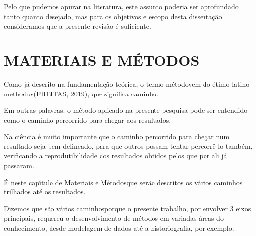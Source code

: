 \documentclass[
12pt,		%
openright,	%
twoside,  %
a4paper,			%
chapter=TITLE,		%
english,			%
french,				%
spanish,			%
brazil				%
]{USPSC-classe/USPSC}
\begin{document}
Pelo que pudemos apurar na literatura, este assunto poderia ser aprofundado tanto quanto desejado, mas para os objetivos e escopo desta disserta\c{c}\~ao consideramos que a presente revis\~ao \'e suficiente.









\chapter[MATERIAIS E M\'ETODOS]{MATERIAIS E M\'ETODOS}\label{MATERIAIS E M\'ETODOS}
Como j\'a descrito na fundamenta\c{c}\~ao te\'orica, o termo \textquotedbl m\'etodo\textquotedbl  vem do \'etimo latino \textquotedbl methodus\textquotedbl   (FREITAS, 2019), que significa \textquotedbl caminho\textquotedbl .









Em outras palavras: o m\'etodo aplicado na presente pesquisa pode ser entendido como o caminho percorrido para chegar aos resultados.









Na ci\^encia \'e muito importante que o caminho percorrido para chegar num resultado seja bem delineado, para que outros possam tentar percorr\^e-lo tamb\'em, verificando a reprodutibilidade dos resultados obtidos pelos que por ali j\'a passaram.









\'E neste cap\'{\i}tulo de \textquotedbl Materiais e M\'etodos\textquotedbl  que ser\~ao descritos os v\'arios caminhos trilhados at\'e os resultados.









Dizemos que s\~ao \textquotedbl v\'arios caminhos\textquotedbl  porque o presente trabalho, por envolver 3 eixos principais, requereu o desenvolvimento de m\'etodos em variadas \'areas do conhecimento, desde modelagem de dados at\'e a historiografia, por exemplo.
\end{document}
